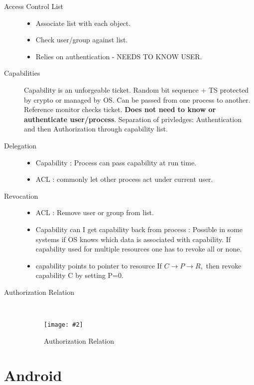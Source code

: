 \documentclass[a4paper,10pt]{scrreprt}
\newcommand{\pic}[2][figure]{\begin{figure}[h]
 \centering
 \texttt{[image: \#2]}
 \caption{#1}
\end{figure}
}
\begin{document}
\begin{description}
 \item [Access Control List] \begin{itemize}
                              \item Associate list with each object.
                              \item Check user/group against list.
                              \item Relies on authentication - NEEDS TO KNOW USER.
                             \end{itemize}
\item [Capabilities] Capability is an unforgeable ticket. Random bit sequence + TS protected by crypto or managed by OS.
Can be passed from one process to another. Reference monitor checks ticket. \textbf{Does not need to know or 
authenticate user/process}. Separation of privledges: Authentication and then Authorization through capability list.
\item[Delegation] \begin{itemize}
                   \item Capability : Process can pass capability at run time.
                   \item ACL : commonly let other process act under current user.
                   
                  \end{itemize}
\item[Revocation] \begin{itemize} \item ACL : Remove user or group from list.
                   \item  Capability can I get capability back from process : Possible in some systems if OS knows 
which data is associated with capability. If capability used for multiple resources one has to revoke all or none. 
		  \item capability points to pointer to resource  If $C \rightarrow P \rightarrow R,$ then revoke 
capability C by setting P=0.
                  \end{itemize}

\item [Authorization Relation] \hfill \\
\pic[Authorization Relation]{aclr.png}

\end{description}

\chapter{Android}
 
\end{document}
